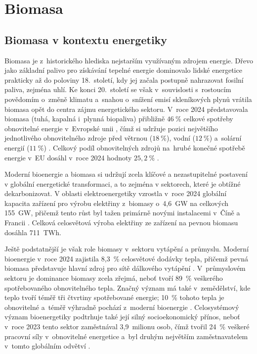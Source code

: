 
\chapter{Biomasa}
\label{chap:biomasa}
 
\section{Biomasa v kontextu energetiky}
\label{sec:biomasa-energetika}
 
Biomasa je z~historického hlediska nejstarším využívaným zdrojem energie. Dřevo jako základní palivo pro získávání tepelné energie dominovalo lidské energetice prakticky až do poloviny 18.~století, kdy jej začala postupně nahrazovat fosilní paliva, zejména uhlí. Ke konci 20.~století se však v~souvislosti s~rostoucím povědomím o~změně klimatu a~snahou o~snížení emisí skleníkových plynů vrátila biomasa opět do centra zájmu energetického sektoru. V~roce 2024 představovala biomasa (tuhá, kapalná i~plynná biopaliva) přibližně $46~\%$ celkové spotřeby obnovitelné energie v~Evropské 
unii \citep{eea_2025}, čímž si udržuje pozici největšího 
jednotlivého obnovitelného zdroje před větrnou ($18~\%$), vodní 
($12~\%$) a~solární energií ($11~\%$) \citep{eea_2025}. Celkový 
podíl obnovitelných zdrojů na~hrubé konečné spotřebě energie 
v~EU dosáhl v~roce 2024 hodnoty $25{,}2~\%$ \citep{eurostat_2025}.

Moderní bioenergie a biomasa si udržují zcela klíčové a nezastupitelné
postavení v globální energetické transformaci, a to zejména v sektorech,
které je obtížné dekarbonizovat. V oblasti elektroenergetiky vzrostla
v~roce 2024 globální kapacita zařízení pro výrobu elektřiny z~biomasy
o~4,6~GW na celkových 155~GW, přičemž tento růst byl tažen primárně
novými instalacemi v~Číně a Francii \citep{ren21_2025}. Celková
celosvětová výroba elektřiny ze zařízení na pevnou biomasu dosáhla
711~TWh.
 
Ještě podstatnější je však role biomasy v~sektoru vytápění a průmyslu.
Moderní bioenergie v~roce 2024 zajistila 8,3~\% celosvětové dodávky
tepla, přičemž pevná biomasa představuje hlavní zdroj pro sítě dálkového
vytápění \citep{ren21_2025}. V~průmyslovém sektoru je dominance biomasy
zcela zřejmá, neboť tvoří 89~\% veškerého spotřebovaného obnovitelného
tepla. Značný význam má také v~zemědělství, kde teplo tvoří téměř tři
čtvrtiny spotřebované energie; 10~\% tohoto tepla je obnovitelné
a~téměř výhradně pochází z~moderní bioenergie \citep{ren21_2025}. Celosystémový význam bioenergetiky podtrhuje také její silný
socioekonomický přínos, neboť v~roce 2023 tento sektor zaměstnával
3,9~milionu osob, čímž tvořil 24~\% veškeré pracovní síly v~obnovitelné
energetice a~byl druhým největším zaměstnavatelem v~tomto globálním
odvětví \citep{ren21_2025}.
 
